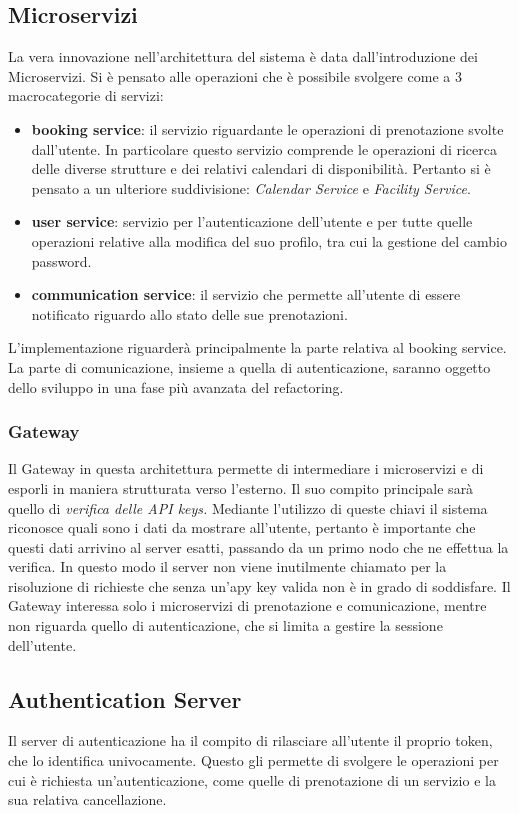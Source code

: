 \subsection{Microservizi}
La vera innovazione nell'architettura del sistema è data dall'introduzione dei Microservizi. Si è pensato alle operazioni che è possibile svolgere come a 3 macrocategorie di servizi:
\begin{itemize}
    \item \textbf{booking service}: il servizio riguardante le operazioni di prenotazione svolte dall'utente. In  particolare questo servizio comprende le operazioni di ricerca delle diverse strutture e dei relativi calendari di disponibilità. Pertanto si è pensato a un ulteriore suddivisione: \emph{Calendar Service} e \emph{Facility Service}.
    \item \textbf{user service}: servizio per l'autenticazione dell'utente e per tutte quelle operazioni relative alla modifica del suo profilo, tra cui la gestione del cambio password.
    \item \textbf{communication service}: il servizio che permette all'utente di essere notificato riguardo allo stato delle sue prenotazioni. 
\end{itemize}
L'implementazione riguarderà principalmente la parte relativa al booking service. La parte di comunicazione, insieme a quella di autenticazione, saranno oggetto dello sviluppo in una fase più avanzata del refactoring.

\subsubsection{Gateway}
Il Gateway in questa architettura permette di intermediare i microservizi e di esporli in maniera strutturata verso l'esterno. Il suo compito principale sarà quello di \emph{verifica delle API keys.} Mediante l'utilizzo di queste chiavi il sistema riconosce quali sono i dati da mostrare all'utente, pertanto è importante che questi dati arrivino al server esatti, passando da un primo nodo che ne effettua la verifica. In questo modo il server non viene inutilmente chiamato per la risoluzione di richieste che senza un'apy key valida non è in grado di soddisfare. Il Gateway interessa solo i microservizi di prenotazione e comunicazione, mentre non riguarda quello di autenticazione, che si limita a gestire la sessione dell'utente.

\subsection{Authentication Server}
Il server di autenticazione ha il compito di rilasciare all'utente il proprio token, che lo identifica univocamente. Questo gli permette di svolgere le operazioni per cui è richiesta un'autenticazione, come quelle di prenotazione di un servizio e la sua relativa cancellazione. 

